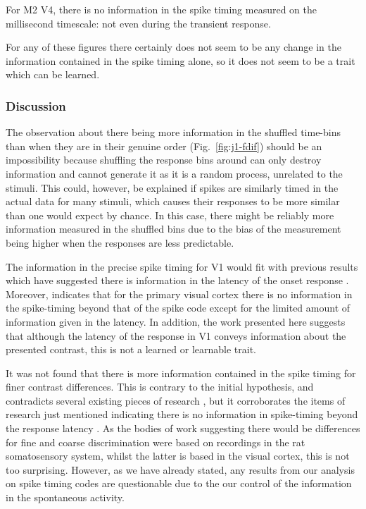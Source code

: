 For \ac{M2} \ac{V4}, there is no information in the spike timing measured on the millisecond timescale: not even during the transient response.

For any of these figures there certainly does not seem to be any change in the information contained in the spike timing alone, so it does not seem to be a trait which can be learned.



\subsubsection{Discussion}

The observation about there being more information in the shuffled time-bins than when they are in their genuine order (Fig.~\ref{fig:j1-fdif}) should be an impossibility because shuffling the response bins around can only destroy information and cannot generate it as it is a random process, unrelated to the stimuli.
This could, however, be explained if spikes are similarly timed in the actual data for many stimuli, which causes their responses to be more similar than one would expect by chance.
In this case, there might be reliably more information measured in the shuffled bins due to the bias of the measurement being higher when the responses are less predictable.

The information in the precise spike timing for \ac{V1} would fit with previous results which have suggested there is information in the latency of the onset response
\citep{Reich2001,Tovee1993,Rolls2011}.
Moreover, \citep{Tovee1993,Rolls2011} indicates that for the primary visual cortex there is no information in the spike-timing beyond that of the spike code except for the limited amount of information given in the latency.
In addition, the work presented here suggests that although the latency of the response in \ac{V1} conveys information about the presented contrast, this is not a learned or learnable trait.


It was not found that there is more information contained in the spike timing for finer contrast differences.
This is contrary to the initial hypothesis, and contradicts several existing pieces of research \citep{Reich2001,Arabzadeh2006}, but it corroborates the items of research just mentioned indicating there is no information in spike-timing beyond the response latency \citep{Reich2001,Tovee1993,Rolls2011}.
As the bodies of work suggesting there would be differences for fine and coarse discrimination were based on recordings in the rat somatosensory system, whilst the latter is based in the visual cortex, this is not too surprising.
However, as we have already stated, any results from our analysis on spike timing codes are questionable due to the our control of the information in the spontaneous activity.



